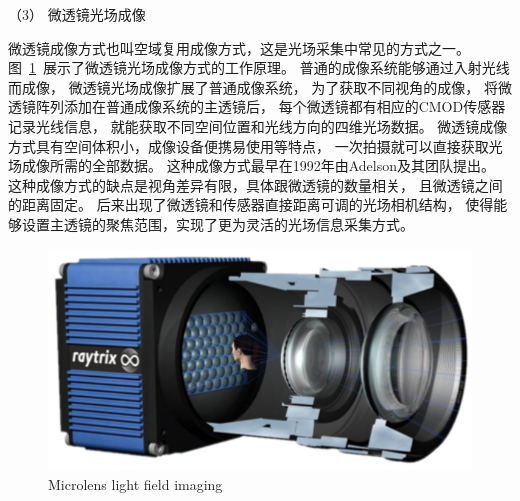 





（3）
微透镜光场成像


微透镜成像方式也叫空域复用成像方式，这是光场采集中常见的方式之一。
图~\ref{chapter2_fig4:microlens_for_lf_imaging}~展示了微透镜光场成像方式的工作原理。
普通的成像系统能够通过入射光线而成像，
微透镜光场成像扩展了普通成像系统，
为了获取不同视角的成像，
将微透镜阵列添加在普通成像系统的主透镜后，
每个微透镜都有相应的CMOD传感器记录光线信息，
就能获取不同空间位置和光线方向的四维光场数据。
微透镜成像方式具有空间体积小，成像设备便携易使用等特点，
一次拍摄就可以直接获取光场成像所需的全部数据。
这种成像方式最早在1992年由Adelson及其团队提出。
这种成像方式的缺点是视角差异有限，具体跟微透镜的数量相关，
且微透镜之间的距离固定。
后来出现了微透镜和传感器直接距离可调的光场相机结构，
使得能够设置主透镜的聚焦范围，实现了更为灵活的光场信息采集方式。




\begin{figure}[t]
	\centering
	\includegraphics[width=0.65\linewidth]{figures/chapter2/microlens_for_lf_imaging2.drawio}
	{Microlens light field imaging}  
	\label{chapter2_fig4:microlens_for_lf_imaging}
\end{figure}






%
%
%





